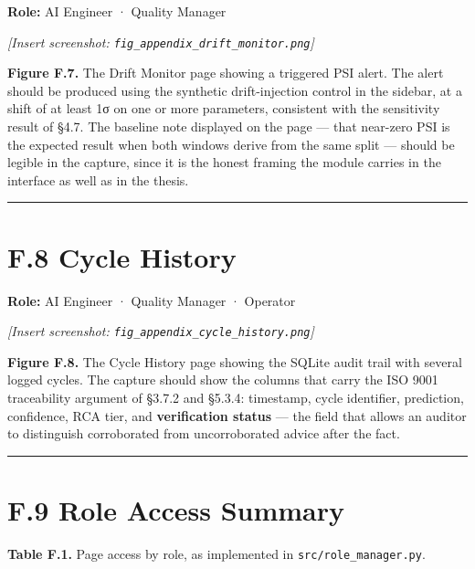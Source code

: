 \textbf{Role:} AI Engineer · Quality Manager

\emph{{[}Insert screenshot: \texttt{fig\_appendix\_drift\_monitor.png}{]}}

\textbf{Figure F.7.} The Drift Monitor page showing a triggered PSI alert. The alert should be produced using the synthetic drift-injection control in the sidebar, at a shift of at least 1σ on one or more parameters, consistent with the sensitivity result of §4.7. The baseline note displayed on the page --- that near-zero PSI is the expected result when both windows derive from the same split --- should be legible in the capture, since it is the honest framing the module carries in the interface as well as in the thesis.

\begin{center}\rule{0.5\linewidth}{0.5pt}\end{center}

\hypertarget{f.8-cycle-history}{%
\section{F.8 Cycle History}\label{f.8-cycle-history}}

\textbf{Role:} AI Engineer · Quality Manager · Operator

\emph{{[}Insert screenshot: \texttt{fig\_appendix\_cycle\_history.png}{]}}

\textbf{Figure F.8.} The Cycle History page showing the SQLite audit trail with several logged cycles. The capture should show the columns that carry the ISO 9001 traceability argument of §3.7.2 and §5.3.4: timestamp, cycle identifier, prediction, confidence, RCA tier, and \textbf{verification status} --- the field that allows an auditor to distinguish corroborated from uncorroborated advice after the fact.

\begin{center}\rule{0.5\linewidth}{0.5pt}\end{center}

\hypertarget{f.9-role-access-summary}{%
\section{F.9 Role Access Summary}\label{f.9-role-access-summary}}

\textbf{Table F.1.} Page access by role, as implemented in \texttt{src/role\_manager.py}.

